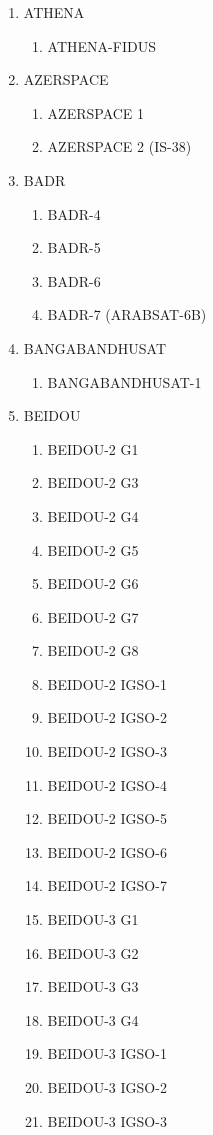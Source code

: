 \begin{multicols}{2}
\begin{enumerate}
  \item ATHENA
  \begin{enumerate}
    \item ATHENA-FIDUS
  \end{enumerate}
  \item AZERSPACE
  \begin{enumerate}
    \item AZERSPACE 1
    \item AZERSPACE 2 (IS-38)
  \end{enumerate}
  \item BADR
  \begin{enumerate}
    \item BADR-4
    \item BADR-5
    \item BADR-6
    \item BADR-7 (ARABSAT-6B)
  \end{enumerate}
  \item BANGABANDHUSAT
  \begin{enumerate}
    \item BANGABANDHUSAT-1
  \end{enumerate}
  \item BEIDOU
  \begin{enumerate}
    \item BEIDOU-2 G1
    \item BEIDOU-2 G3
    \item BEIDOU-2 G4
    \item BEIDOU-2 G5
    \item BEIDOU-2 G6
    \item BEIDOU-2 G7
    \item BEIDOU-2 G8
    \item BEIDOU-2 IGSO-1
    \item BEIDOU-2 IGSO-2
    \item BEIDOU-2 IGSO-3
    \item BEIDOU-2 IGSO-4
    \item BEIDOU-2 IGSO-5
    \item BEIDOU-2 IGSO-6
    \item BEIDOU-2 IGSO-7
    \item BEIDOU-3 G1
    \item BEIDOU-3 G2
    \item BEIDOU-3 G3
    \item BEIDOU-3 G4
    \item BEIDOU-3 IGSO-1
    \item BEIDOU-3 IGSO-2
    \item BEIDOU-3 IGSO-3

\end{enumerate}
\end{enumerate}
\end{multicols}
